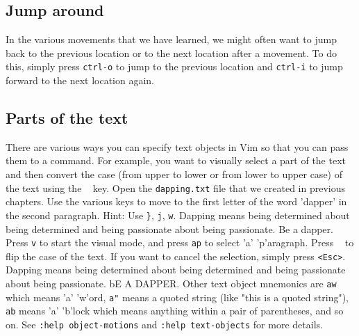 \subsection{Jump around} 
In the various movements that we have learned, we might
often want to jump back to the previous location or to the next location after
a movement. To do this, simply press \texttt{ctrl-o} to jump to the previous
location and \texttt{ctrl-i} to jump forward to the next location again. 

\subsection{Parts of the text} 
There are various ways you can specify text objects in Vim
so that you can pass them to a command. For example, you want to visually
select a part of the text and then convert the case (from upper to lower or
from lower to upper case) of the text using the \texttt{~} key. Open the
\texttt{dapping.txt} file that we created in previous chapters. Use the various
keys to move to the first letter of the word 'dapper' in the second paragraph.
Hint: Use \texttt{\}}, \texttt{j}, \texttt{w}. Dapping means being
determined about being determined and being passionate about being passionate.
Be a dapper. Press \texttt{v} to start the visual
mode, and press \texttt{ap} to select 'a' 'p'aragraph. Press \texttt{~} to flip
the case of the text. If you want to cancel the selection, simply press
\texttt{<Esc>}. Dapping means being determined about being
determined and being passionate about being passionate. bE A
DAPPER. Other text object mnemonics are \texttt{aw} which means
'a' 'w'ord, \texttt{a"} means a quoted string (like "this is a quoted string"),
\texttt{ab} means 'a' 'b'lock which means anything within a pair of
parentheses, and so on. See \texttt{:help object-motions} and \texttt{:help
text-objects} for more details. 
